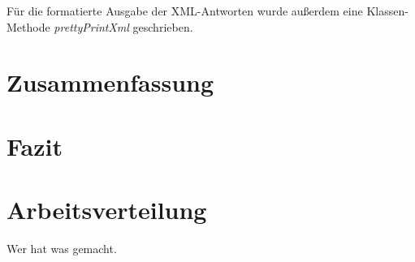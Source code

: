 \documentclass[12pt]{scrartcl}
\begin{document}
	Für die formatierte Ausgabe der XML-Antworten wurde außerdem eine Klassen-Methode \emph{prettyPrintXml} geschrieben.
	
	
	
\chapter{Zusammenfassung}
\chapter{Fazit}
\chapter{Arbeitsverteilung}
Wer hat was gemacht.
\end{document}
